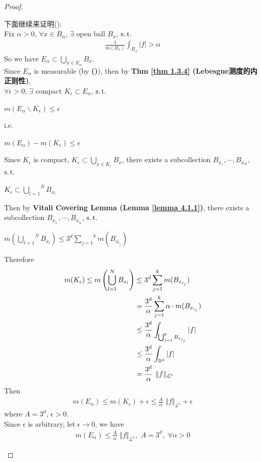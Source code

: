 \begin{proposition}
\begin{proof}
\begin{enumerate}
				下面继续来证明(): \\
				Fix $\alpha > 0$, $\forall x \in B_\alpha$, $\exists$ open ball $B_x$, $\operatorname{s.t.}$
				\begin{align}
					\frac{1}{m(B_x)} \int_{B_x}{\left| f \right|} > \alpha
				\end{align}
				So we have $E_\alpha \subset \underset{x \in E_\alpha}{\bigcup}{B_x}$. \\
				Since $E_\alpha$ is measurable (by \textbf{()}), then by \textbf{Thm \ref{thm 1.3.4} (Lebesgue测度的内正则性)}, \\
				$\forall \epsilon > 0$, $\exists$ compact $K_\epsilon \subset E_\alpha$, $\operatorname{s.t.}$
				\begin{center}
					$m(E_\alpha \backslash K_\epsilon) \leq \epsilon$
				\end{center}
				i.e.
				\begin{center}
					$m(E_\alpha) - m(K_\epsilon) \leq \epsilon$
				\end{center}
				Since $K_\epsilon$ is compact, $K_\epsilon \subset \underset{x \in K_\epsilon}{\bigcup}{B_x}$, there exists a subcollection $B_{x_1} , \cdots , B_{x_N}$, $\operatorname{s.t.}$
				\begin{center}
					$K_\epsilon \subset \overset{N}{\underset{l = 1}{\bigcup}}{B_{x_l}}$
				\end{center}
				Then by \textbf{Vitali Covering Lemma (Lemma \ref{lemma 4.1.1})}, there exists a subcollection $B_{x_{i_1}} , \cdots , B_{x_{i_k}}$, $\operatorname{s.t.}$
				\begin{center}
					$m\left( \overset{N}{\underset{l = 1}{\bigcup}}{B_{x_l}} \right) 
					\leq 3^d \overset{k}{\underset{j = 1}{\sum}}{m(B_{x_{i_j}})}$
				\end{center}
				Therefore
				\begin{align}
					m(K_\epsilon) 
					\leq m\left( \bigcup_{l = 1}^{N}{B_{x_l}} \right)
					&\leq 3^d \sum_{j = 1}^{k}{m(B_{x_{i_j}})} \\
					&= \frac{3^d}{\alpha} \sum_{j = 1}^{k}{\alpha \cdot m(B_{x_{i_j}})} \\
					&\leq \frac{3^d}{\alpha} \int_{\bigcup_{j = 1}^{k}{B_{x_{i_j}}}}{\left| f \right|} \\
					&\leq \frac{3^d}{\alpha} \int_{\mathbb{R}^d}{\left| f \right|} \\
					&= \frac{3^d}{\alpha} \,\, \Vert f \Vert_{\mathcal{L}^1}
				\end{align}
				Then
				\begin{align}
					m(E_\alpha) 
					\leq m(K_\epsilon) + \epsilon 
					\leq \frac{A}{\alpha} \,\, \Vert f \Vert_{\mathcal{L}^1} + \epsilon
				\end{align}
				where $A = 3^d$, $\epsilon > 0$. \\
				Since $\epsilon$ is arbitrary, let $\epsilon \to 0$, we have
				\begin{align}
					m(E_\alpha) \leq \frac{A}{\alpha} \,\, \Vert f \Vert_{\mathcal{L}^1} , \,\, A = 3^d , \,\, \forall \alpha > 0
				\end{align}
			\end{enumerate}
		\end{proof}
	\end{proposition}

